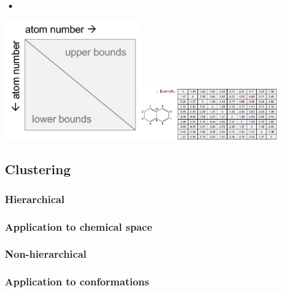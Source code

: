 \begin{itemize}
    \item 
\end{itemize}

\begin{center}\includegraphics[width=0.45\textwidth]{img/cheminformatics/3dInitialDistanceMatrixEmpty.png}\includegraphics[width=0.45\textwidth]{img/cheminformatics/3dInitialDistanceMatrix.png}\end{center}

\subsection{Clustering}

\subsubsection{Hierarchical}

\subsubsection{Application to chemical space}

\subsubsection{Non-hierarchical}

\subsubsection{Application to conformations}